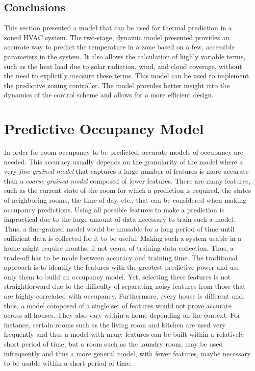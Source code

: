 \subsection{Conclusions}
\label{sec:conclusions}

This section presented a model that can be used for thermal prediction in a
zoned HVAC system. The two-stage, dynamic model presented provides an accurate
way to predict the temperature in a zone based on a few, accessible parameters
in the system. It also allows the calculation of highly variable terms, such as
the heat load due to solar radiation, wind, and cloud coverage, without the need
to explicitly measure these terms. This model can be used to implement the
predictive zoning controller. The model provides better insight into the
dynamics of the control scheme and allows for a more efficient design.

\section{Predictive Occupancy Model}
\label{sec:occupancyModel}


In order for room occupancy to be predicted, accurate models of occupancy are
needed. This accuracy usually depends on the granularity of the model where a
very {\em fine-grained model} that captures a large number of features is more
accurate than a {\em coarse-grained model} composed of fewer features.  There
are many features, such as the current state of the room for which a prediction
is required, the states of neighboring rooms, the time of day, etc., that can be
considered when making occupancy predictions. Using all possible features to
make a prediction is impractical due to the large amount of data necessary to
train such a model. Thus, a fine-grained model would be unusable for a long
period of time until sufficient data is collected for it to be useful.  Making
such a system usable in a home might require months, if not years, of training
data collection. Thus, a trade-off has to be made between accuracy and training
time. The traditional approach is to identify the features with the greatest
predictive power and use only them to build an occupancy model. Yet, selecting
these features is not straightforward due to the difficulty of separating noisy
features from those that are highly correlated with occupancy. Furthermore,
every house is different and, thus, a model composed of a single set of features
would not prove accurate across all houses. They also vary within a home
depending on the context. For instance, certain rooms such as the living room
and kitchen are used very frequently and thus a model with many features can be
built within a relatively short period of time, but a room such as the laundry
room, may be used infrequently and thus a more general model, with fewer
features, maybe necessary to be usable within a short period of time.

